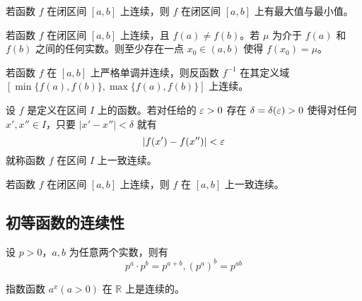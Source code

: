 \begin{theorem}[最大、最小值定理]
	若函数 $f$ 在闭区间 $[a,b]$ 上连续，则 $f$ 在闭区间 $[a,b]$ 上有最大值与最小值。
\end{theorem}

\begin{theorem}[介值定理]
	若函数 $f$ 在闭区间 $[a,b]$ 上连续，且 $f(a)\ne f(b)$。若 $\mu$ 为介于 $f(a)$ 和 $f(b)$ 之间的任何实数。则至少存在一点 $x_0\in (a,b)$ 使得 $f(x_0)=\mu$。
\end{theorem}

\begin{theorem}
	若函数 $f$ 在 $[a,b]$ 上严格单调并连续，则反函数 $f^{-1}$ 在其定义域 $[\min\{f(a),f(b)\},\max\{f(a),f(b)\}]$ 上连续。
\end{theorem}

\begin{definition}
	设 $f$ 是定义在区间 $I$ 上的函数。若对任给的 $\varepsilon>0$ 存在 $\delta=\delta(\varepsilon)>0$ 使得对任何 $x',x''\in I$，只要 $|x'-x''|<\delta$ 就有
	\[ |f(x')-f(x'')|<\varepsilon \]
	就称函数 $f$ 在区间 $I$ 上一致连续。
\end{definition}

\begin{theorem}[一致连续性]
	若函数 $f$ 在闭区间 $[a,b]$ 上连续，则 $f$ 在 $[a,b]$ 上一致连续。
\end{theorem}

\subsection{初等函数的连续性}

\begin{theorem}
	设 $p>0$，$a,b$ 为任意两个实数，则有
	\[ p^a\cdot p^b = p^{a+b},(p^a)^b=p^{ab} \]
\end{theorem}

\begin{theorem}
	指数函数 $a^x(a>0)$ 在 $\mathbb{R}$ 上是连续的。
\end{theorem}



